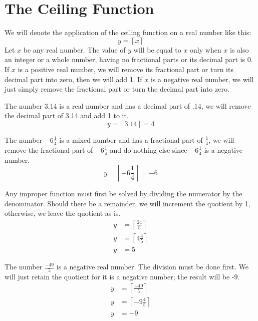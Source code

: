 \documentclass[letterpaper, twoside,12pt]{book}
\begin{document}
    \section{The Ceiling Function}

    We will denote the application of the ceiling function on a real number like this:
    \begin{equation}
        y = \left\lceil x \right\rceil
    \end{equation}
    Let $x$ be any real number. The value of $y$ will be equal to $x$ only when $x$ is also an integer or a whole number, having no fractional parts or its decimal part is 0. If $x$ is a positive real number, we will remove its fractional part or turn its decimal part into zero, then we will add 1. If $x$ is a negative real number, we will just simply remove the fractional part or turn the decimal part into zero.

    The number 3.14 is a real number and has a decimal part of .14, we will remove the decimal part of 3.14 and add 1 to it.
    \begin{equation*}
        y = \left\lceil 3.14 \right\rceil = 4
    \end{equation*}

    The number $-6\frac{1}{4}$ is a mixed number and has a fractional part of $\frac{1}{4}$, we will remove the fractional part of $-6\frac{1}{4}$ and do nothing else since $-6\frac{1}{4}$ is a negative number.
    \begin{equation*}
        y = \left\lceil -6\frac{1}{4} \right\rceil = -6
    \end{equation*}

    Any improper function must first be solved by dividing the numerator by the denominator. Should there be a remainder, we will increment the quotient by 1, otherwise, we leave the quotient as is.
    \begin{equation*}
        \begin{split}
            y &= \left\lceil \frac{24}{5} \right\rceil \\
            y &= \left\lceil 4\frac{4}{5} \right\rceil \\
            y &= 5
        \end{split}
    \end{equation*}

    The number $\frac{-49}{5}$ is a negative real number. The division must be done first. We will just retain the quotient for it is a negative number; the result will be -9.
    \begin{equation*}
        \begin{split}
            y &= \left\lceil \frac{-49}{5} \right\rceil \\
            y &= \left\lceil -9\frac{4}{5} \right\rceil \\
            y &= -9
        \end{split}
    \end{equation*}
\end{document}
